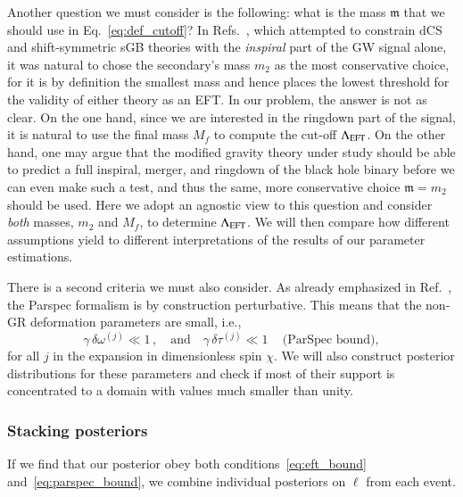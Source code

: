 \documentclass[twocolumn,prd,aps,superscriptaddress,preprintnumbers,tightenlines,showpacs,nofootinbib,amsfonts,amsmath,longbibliography]{revtex4-1}
\newcommand{\gm}{\mathfrak{m}}
\begin{document}
Another question we must consider is the following: what is the mass $\mathfrak{m}$ that we should use
in Eq.~\eqref{eq:def_cutoff}?
%
In Refs.~\cite{Nair:2019iur,Perkins:2021mhb,Lyu:2022gdr}, which attempted to
constrain dCS and shift-symmetric sGB theories with the \emph{inspiral} part of
the GW signal alone, it was natural to chose the secondary's mass $m_2$ as the most
conservative choice, for it is by definition the smallest mass and hence
places the lowest threshold for the validity of either theory as an EFT.
%
In our problem, the answer is not as clear. On the one hand, since we are
interested in the ringdown part of the signal, it is natural to use the
final mass $M_f$ to compute the cut-off $\Lambda_{\rm EFT}$.
%
On the other hand, one may argue that the modified gravity theory under study
should be able to predict a full inspiral, merger, and ringdown of the black
hole binary before we can even make such a test, and thus the same, more conservative choice
$\gm = m_2$ should be used.
%
Here we adopt an agnostic view to this question and consider \emph{both} masses, $m_2$ and $M_f$, to
determine $\Lambda_{\rm EFT}$. We will then compare how different assumptions
yield to different interpretations of the results of our parameter estimations.

There is a second criteria we must also consider.
%
As already emphasized in Ref.~\cite{Maselli:2019mjd}, the {\sc Parspec}
formalism is by construction perturbative. This means that the non-GR
deformation parameters are small, i.e.,
%
\begin{equation}
\gamma \, \delta \omega^{(j)} \ll 1 \,,
\quad \textrm{and} \quad
\gamma \, \delta \tau^{(j)} \ll 1 \, \quad \textrm{(ParSpec bound)},
\label{eq:parspec_bound}
\end{equation}
%
for all $j$ in the expansion in dimensionless spin $\chi$.
%
We will also construct posterior distributions for these parameters and check if
most of their support is concentrated to a domain with values much smaller than
unity.

\subsubsection{Stacking posteriors}
\label{sec:stack}

If we find that our posterior obey both conditions~\eqref{eq:eft_bound}
and~\eqref{eq:parspec_bound}, we combine individual posteriors on $\ell$ from
each event.
\end{document}

